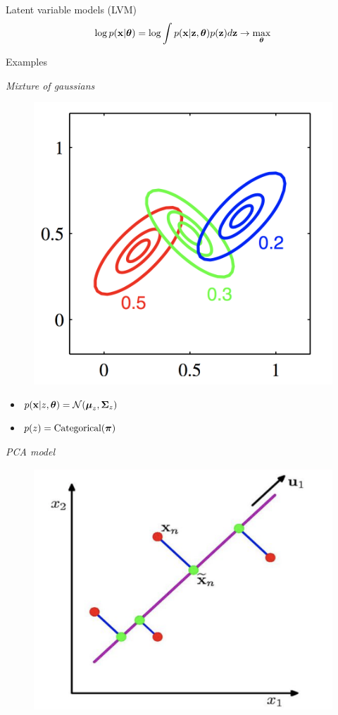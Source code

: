 \begin{frame}{Latent variable models (LVM)}
	\[
	\log p(\mathbf{x} | \boldsymbol{\theta}) = \log \int p(\mathbf{x} | \mathbf{z}, \boldsymbol{\theta}) p(\mathbf{z}) d\mathbf{z} \rightarrow \max_{\boldsymbol{\theta}}
	\]
	\vspace{-0.6cm}
	\begin{block}{Examples}
		\begin{minipage}[t]{0.45\columnwidth}
			\textit{Mixture of gaussians} \\
			\vspace{-0.5cm}
			\begin{figure}
				\centering
				\includegraphics[width=0.75\linewidth]{figs/mixture_of_gaussians}
			\end{figure}
			\vspace{-0.5cm}
			\begin{itemize}
				\item $p(\mathbf{x} | z, \boldsymbol{\theta}) = \mathcal{N}(\boldsymbol{\mu}_z, \boldsymbol{\Sigma}_z)$
				\item $p(z) = \text{Categorical}(\boldsymbol{\pi})$
			\end{itemize}
		\end{minipage}%
		\begin{minipage}[t]{0.53\columnwidth}
			\textit{PCA model} \\
			\vspace{-0.5cm}
			\begin{figure}
				\centering
				\includegraphics[width=.7\linewidth]{figs/pca}

\end{figure}
\end{minipage}
\end{block}
\end{frame}
